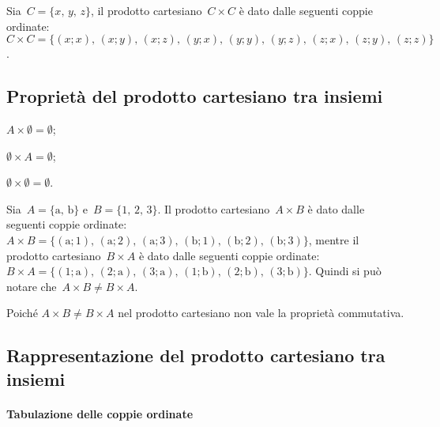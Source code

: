 \begin{exrig}
 \begin{esempio}
Sia~$C=\{x\text{, }y\text{, }z\}$, il prodotto cartesiano~$C\times C$ è dato dalle
seguenti coppie ordinate:~$C\times C=\{(x;x)\text{, }(x;y)\text{, }(x;z)\text{, }(y;x)\text{, }(y;y)\text{, }(y;z)\text{, }(z;x)\text{, }(z;y)\text{, }(z;z)\}$.
 \end{esempio}
\end{exrig}

\subsection{Proprietà del prodotto cartesiano tra insiemi}

\begin{enumeratea}
 \item $A\times \emptyset =\emptyset$;
 \item $\emptyset \times A=\emptyset$;
 \item $\emptyset \times \emptyset =\emptyset$.
\end{enumeratea}

\begin{exrig}
 \begin{esempio}
Sia~$A=\{\text{a, b}\}$ e~$B=\{\text{1, 2, 3}\}$. Il prodotto cartesiano~$A\times B$ è dato dalle seguenti coppie ordinate:
$A\times B=\{(\text{a};1)\text{, }(\text{a};2)\text{, }(\text{a};3)\text{, }(\text{b};1)\text{, }(\text{b};2)\text{, }(\text{b};3)\}$, mentre il prodotto cartesiano~$B\times A$
è dato dalle seguenti coppie ordinate:
$B\times A=\{(1;\text{a})\text{, }(2;\text{a})\text{, }(3;\text{a})\text{, }(1;\text{b})\text{, }(2;\text{b})\text{, }(3;\text{b})\}$.
Quindi si può notare che~$A\times B\neq B\times A$.
 \end{esempio}
\end{exrig}

Poiché $A\times B\neq B\times A$ nel prodotto cartesiano non vale la
proprietà commutativa.

\vspazio\ovalbox{\risolvii \ref{ese:7.19}, \ref{ese:7.20}, \ref{ese:7.21}, \ref{ese:7.22}, \ref{ese:7.23}, \ref{ese:7.24} }

\subsection{Rappresentazione del prodotto cartesiano tra insiemi}
\paragraph{Tabulazione delle coppie ordinate}

